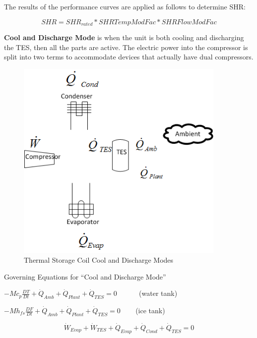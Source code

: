 The results of the performance curves are applied as follows to determine SHR:

\begin{equation}
SHR = SH{R_{rated}}*SHRTempModFac*SHRFlowModFac
\end{equation}

\textbf{Cool and Discharge Mode} is when the unit is both cooling and discharging the TES, then all the parts are active. The electric power into the compressor is split into two terms to accommodate devices that actually have dual compressors.

\begin{figure}[hbtp] %
\centering
\includegraphics[width=0.9\textwidth, height=0.9\textheight, keepaspectratio=true]{media/image4331.png}
\caption{Thermal Storage Coil Cool and Discharge Modes \protect \label{fig:thermal-storage-coil-cool-and-discharge-modes}}
\end{figure}

Governing Equations for ``Cool and Discharge Mode''

\(- M{c_p}\frac{{DT}}{{Dt}} + {\dot Q_{Amb}} + {\dot Q_{Plant}} + {\dot Q_{TES}} = 0\) ~~~~~ (water tank)

\(- M{h_{fs}}\frac{{DF}}{{Dt}} + {\dot Q_{Amb}} + {\dot Q_{Plant}} + {\dot Q_{TES}} = 0\) ~~~ (ice tank)

\begin{equation}
{\dot W_{Evap}} + {\dot W_{TES}} + {\dot Q_{Evap}} + {\dot Q_{Cond}} + {\dot Q_{TES}} = 0
\end{equation}

